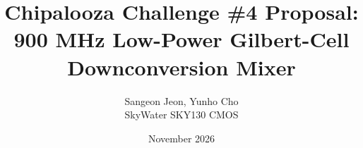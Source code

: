 \title{\textbf{Chipalooza Challenge \#4 Proposal: 900 MHz Low-Power Gilbert-Cell Downconversion Mixer}
}
\author{
    Sangeon Jeon, Yunho Cho \\%
    SkyWater SKY130 CMOS
}
\date{November 2026}

\maketitle
